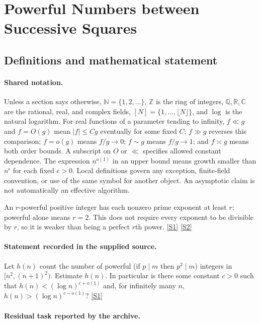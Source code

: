\documentclass[11pt,a4paper]{article}
\newcommand{\N}{\mathbb{N}}
\newcommand{\Z}{\mathbb{Z}}
\newcommand{\Q}{\mathbb{Q}}
\newcommand{\R}{\mathbb{R}}
\newcommand{\C}{\mathbb{C}}
\newcommand{\sref}[2]{\hyperlink{source:#1:#2}{[S#2]}}
\begin{document}
\section{Powerful Numbers between Successive Squares}\label{statement}


\subsection{Definitions and mathematical statement}

\paragraph{Shared notation.}Unless a section says otherwise, $\N=\{1,2,\ldots\}$,
$\Z$ is the ring of integers, $\Q,\R,\C$ are the rational, real, and complex
fields, $[N]=\{1,\ldots,\lfloor N\rfloor\}$, and $\log$ is the natural
logarithm. For real functions of a parameter tending to infinity,
$f\ll g$ and $f=O(g)$ mean $|f|\leq Cg$ eventually for some fixed $C$;
$f\gg g$ reverses this comparison; $f=o(g)$ means $f/g\to0$;
$f\sim g$ means $f/g\to1$; and $f\asymp g$ means both order bounds.
A subscript on $O$ or $\ll$ specifies allowed constant dependence.
The expression $n^{o(1)}$ in an upper bound means growth smaller than
$n^\epsilon$ for each fixed $\epsilon>0$. Local definitions govern any
exception, finite-field convention, or use of the same symbol for another
object. An asymptotic claim is not automatically an effective algorithm.



An $r$-powerful positive integer has each nonzero prime exponent at least $r$; powerful alone means $r=2$. This does not require every exponent to be divisible by $r$, so it is weaker than being a perfect $r$th power. \sref{statement}{1} \sref{statement}{2}

\paragraph{Statement recorded in the supplied source.}
Let $h(n)$ count the number of powerful (if $p\mid m$ then $p^2\mid m$) integers in $[n^2,(n+1)^2)$. Estimate $h(n)$. In particular is there some constant $c>0$ such that $ h(n) < (\log n)^{c+o(1)} $ and, for infinitely many $n$, $ h(n) >(\log n)^{c-o(1)}? $ \sref{statement}{1}

\paragraph{Residual task reported by the archive.}
\end{document}
